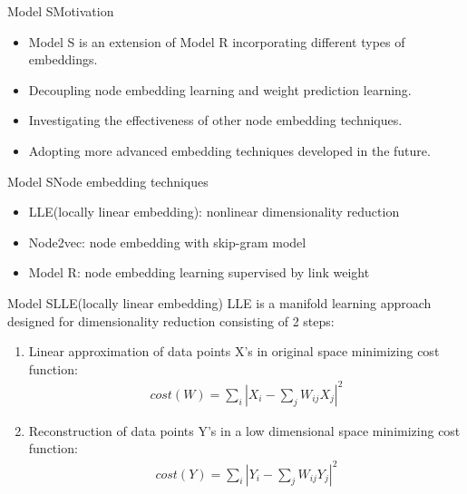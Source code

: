 \documentclass{beamer}
\begin{document}
\begin{frame}{Model S}{Motivation}
	\begin{itemize}
		\item Model S is an extension of Model R incorporating different types of embeddings.
		\item Decoupling node embedding learning and weight prediction learning.
		\item Investigating the effectiveness of other node embedding techniques.
		\item Adopting more advanced embedding techniques developed in the future.
	\end{itemize}
\end{frame}

\begin{frame}{Model S}{Node embedding techniques}
	\begin{itemize}
		\item LLE(locally linear embedding): nonlinear dimensionality reduction
		\item Node2vec: node embedding with skip-gram model
		\item Model R: node embedding learning supervised by link weight
	\end{itemize}
\end{frame}

\begin{frame}{Model S}{LLE(locally linear embedding)}
	LLE is a manifold learning approach designed for dimensionality reduction consisting of 2 steps:
	\begin{enumerate}
		\item Linear approximation of data points X's in original space minimizing cost function:
		\begin{align*}
			cost(W) = \sum_i |X_i - \sum_jW_{ij}X_j|^2
		\end{align*}
		\item Reconstruction of data points Y's in a low dimensional space minimizing cost function:
		\begin{align*}
		cost(Y) = \sum_i |Y_i - \sum_jW_{ij}Y_j|^2
		\end{align*}
	\end{enumerate}
\end{frame}
\end{document}
